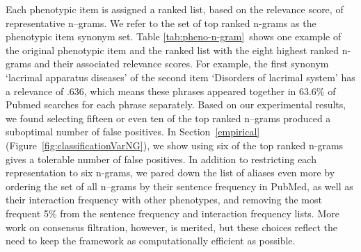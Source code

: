 \documentclass{sig-alternate}
\begin{document}
Each phenotypic item is assigned a ranked list, based on the relevance score, of representative n--grams.
We refer to the set of top ranked n-grams as the phenotypic item synonym set.
Table \ref{tab:pheno-n-gram}~shows one example of the original phenotypic item and the ranked list with the eight highest ranked n-grams and their associated relevance scores.
For example, the first synonym `lacrimal apparatus diseases' of the second item `Disorders of lacrimal system' has a relevance of .636, which means  these phrases appeared together in 63.6\% of Pubmed searches for each phrase separately.
Based on our experimental results, we found selecting fifteen or even ten of the top ranked n--grams produced a suboptimal number of false positives. 
In Section~\ref{empirical} (Figure~\ref{fig:classificationVarNG}), we show using six of the top ranked n-grams gives a tolerable number of false positives.
In addition to restricting each representation to six n-grams, we pared down the list of aliases even more by ordering the set of all n--grams by their sentence frequency in PubMed, as well as their interaction frequency with other phenotypes, and removing the most frequent 5\% from the sentence frequency and interaction frequency lists.
More work on consensus filtration, however, is merited, but these choices reflect the need to keep the framework as computationally efficient as possible.


\end{document}
